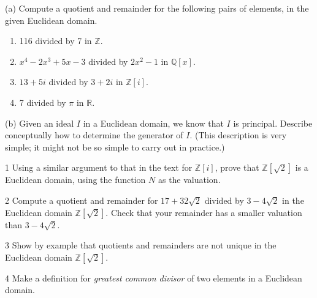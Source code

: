 \begin{problem}[Warmup]{(a)}
    Compute a quotient and remainder for the following pairs of elements, in the given Euclidean domain.
    \begin{enumerate}
        \item[(a)] 116 divided by 7 in $\mathbb{Z}$.
        \item[(b)] $x^4 - 2x^3 + 5x - 3$ divided by $2x^2 - 1$ in $\mathbb{Q}[x]$.
        \item[(c)] $13 + 5i$ divided by $3 + 2i$ in $\mathbb{Z}[i]$.
        \item[(d)] 7 divided by $\pi$ in $\mathbb{R}$.
    \end{enumerate}
\end{problem}
\unsolved

\begin{problem}[Warmup]{(b)}
    Given an ideal $I$ in a Euclidean domain, we know that $I$ is principal. Describe conceptually how to determine the generator of $I$. (This description is very simple; it might not be so simple to carry out in practice.)
\end{problem}
\unsolved

\begin{problem}{1}
    Using a similar argument to that in the text for $\mathbb{Z}[i]$, prove that
    $\mathbb{Z}[\sqrt{2}]$ is a Euclidean domain, using the function $N$ as the valuation.
\end{problem}
\unsolved

\begin{problem}{2}
    Compute a quotient and remainder for $17 + 32\sqrt{2}$ divided by $3 - 4\sqrt{2}$ in
    the Euclidean domain $\mathbb{Z}[\sqrt{2}]$. Check that your remainder has a smaller
    valuation than $3 - 4\sqrt{2}$.
\end{problem}
\unsolved

\begin{problem}{3}
    Show by example that quotients and remainders are not unique in the Euclidean domain
    $\mathbb{Z}[\sqrt{2}]$.
\end{problem}
\unsolved

\begin{problem}{4}
    Make a definition for \emph{greatest common divisor} of two elements in a Euclidean
    domain.
\end{problem}
\unsolved

